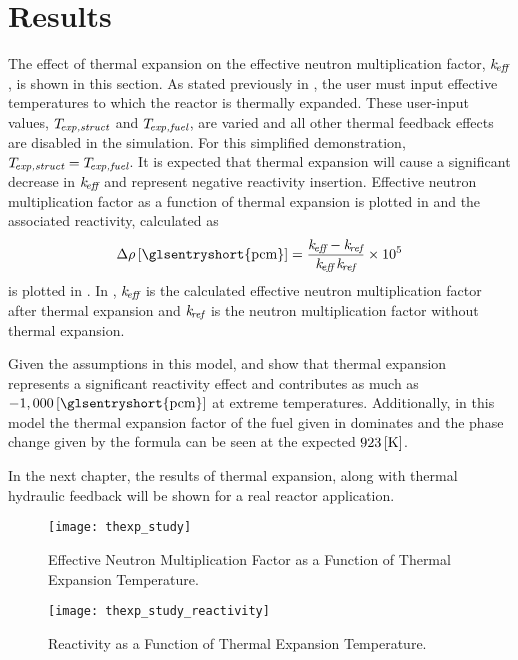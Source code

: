 \section{Results}
  The effect of thermal expansion on the effective neutron multiplication
  factor, $k_{\!\mbox{\scriptsize \em eff}}$, is shown in this section. As stated previously in
  , the user must input effective temperatures to which
  the reactor is thermally expanded. These user-input values, $T_{\!\mbox{\scriptsize \em exp,struct}}$ and
  ${T_{\!\mbox{\scriptsize \em exp,fuel}}}$, are varied and all other thermal feedback effects are disabled in
  the simulation. For this simplified demonstration, $T_{\!\mbox{\scriptsize \em exp,struct}}={T_{\!\mbox{\scriptsize \em exp,fuel}}}$. It
  is expected that thermal expansion will cause a significant decrease in
  $k_{\!\mbox{\scriptsize \em eff}}$ and represent negative reactivity insertion. Effective neutron
  multiplication factor as a function of thermal expansion is plotted in
   and the associated reactivity, calculated as
  \begin{equation}
    \label{eq:reactivity_formula}
    \Delta \rho \units{\glsentryshort{pcm}} = 
      \frac{\keff - \kref}{\keff \, \kref} \times 10^5
  \end{equation}
  is plotted in . In
  , $k_{\!\mbox{\scriptsize \em eff}}$ is the calculated effective neutron
  multiplication factor after thermal expansion and $k_{\!\mbox{\scriptsize \em ref}}$ is the neutron
  multiplication factor without thermal expansion. 

  Given the assumptions in this model,  and
   show that thermal expansion represents a
  significant reactivity effect and contributes as much as $-1,000
  \units{\glsentryshort{pcm}}$ at extreme temperatures. Additionally, in this
  model the thermal expansion factor of the fuel given in 
  dominates and the phase change given by the formula can be seen at the
  expected $923 \left[\text{{K}}\right]$.

  In the next chapter, the results of thermal expansion, along with thermal
  hydraulic feedback will be shown for a real reactor application.

  \begin{figure}
    \centering
    \texttt{[image: thexp\_study]}
    \caption{Effective Neutron Multiplication Factor as a Function of 
      Thermal Expansion Temperature.}
    \label{fig:thexp_study}
  \end{figure}

  \begin{figure}
    \centering
    \texttt{[image: thexp\_study\_reactivity]}
    \caption{Reactivity as a Function of Thermal Expansion Temperature.}
    \label{fig:thexp_study_reactivity}
  \end{figure}
